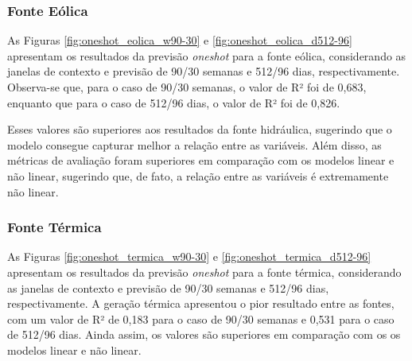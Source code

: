 \subsubsection{Fonte Eólica}
\begin{figure}[!ht]
  {}
  {}
\end{figure}
\begin{figure}[!ht]
  {}
  {}
\end{figure}
As Figuras \ref{fig:oneshot_eolica_w90-30} e \ref{fig:oneshot_eolica_d512-96} apresentam os resultados da previsão
\textit{oneshot} para a fonte eólica, considerando as janelas de contexto e previsão de 90/30 semanas e 512/96 dias, respectivamente.
Observa-se que, para o caso de 90/30 semanas, o valor de R² foi de 0,683, enquanto que para o caso de 512/96 dias, o valor de R² foi de 0,826.

Esses valores são superiores aos resultados da fonte hidráulica, sugerindo que o modelo consegue capturar melhor a relação
entre as variáveis. Além disso, as métricas de avaliação foram superiores em comparação com os modelos
linear e não linear, sugerindo que, de fato, a relação entre as variáveis é extremamente não linear.

\subsubsection{Fonte Térmica}
\begin{figure}[!ht]
  {}
  {}
\end{figure}
\begin{figure}[!ht]
  {}
  {}
\end{figure}
As Figuras \ref{fig:oneshot_termica_w90-30} e \ref{fig:oneshot_termica_d512-96} apresentam os resultados da previsão
\textit{oneshot} para a fonte térmica, considerando as janelas de contexto e previsão de 90/30 semanas e 512/96 dias, respectivamente.
A geração térmica apresentou o pior resultado entre as fontes, com um valor de R² de 0,183 para o caso de 90/30 semanas
e 0,531 para o caso de 512/96 dias. Ainda assim, os valores são superiores em comparação com os os
modelos linear e não linear.

